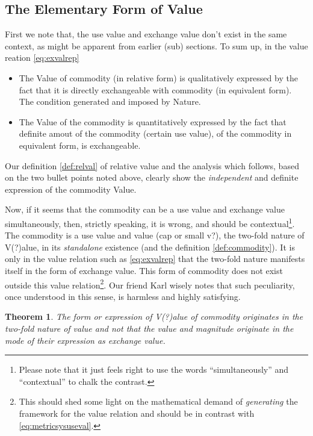 \documentclass[12pt]{extarticle}
\newtheorem{theorem}{Theorem}[section]
\theoremstyle{definition}
\begin{document}
\subsection{The Elementary Form of Value}
\label{sec:elemformval}
First we note that, the use value and exchange value don't exist in the same context, as might be apparent from earlier (sub) sections.  To sum up, in the value reation \ref{eq:exvalrep} 
\begin{itemize}
\item The Value of commodity (in relative form) is qualitatively expressed by the fact that it is directly exchangeable with commodity (in equivalent form).  The condition generated and imposed by Nature.
  \item The Value of the commodity is quantitatively expressed by the fact that definite amout of the commodity (certain use value), of the commodity in equivalent form, is exchangeable.
  \end{itemize}

  Our definition \ref{def:relval} of relative value and the analysis which follows, based on the two bullet points noted above, clearly show the \emph{independent} and definite expression of the commodity Value.

  Now, if it seems that the commodity can be a use value and exchange value simultaneously, then, strictly speaking, it is wrong, and should be contextual\footnote{Please note that it just feels right to use the words ``simultaneously'' and ``contextual'' to chalk the contrast.}.  The commodity is a use value and value (cap or small v?), the two-fold nature of V(?)alue, in its \emph{standalone} existence (and the definition \ref{def:commodity}).  It is only in the value relation such as \ref{eq:exvalrep} that the two-fold nature manifests itself in the form of exchange value.  This form of commodity does not exist outside this value relation\footnote{This should shed some light on the mathematical demand of \emph{generating} the framework for the value relation and should be in contrast with \ref{eq:metricsysuseval}.}.  Our friend Karl wisely notes that such peculiarity, once understood in this sense, is harmless and highly satisfying.

  \begin{theorem}
    The form or expression of V(?)alue of commodity originates in the two-fold nature of value and \emph{not} that the value and magnitude originate in the mode of \emph{their} expression as exchange value.
  \end{theorem}
\end{document}
